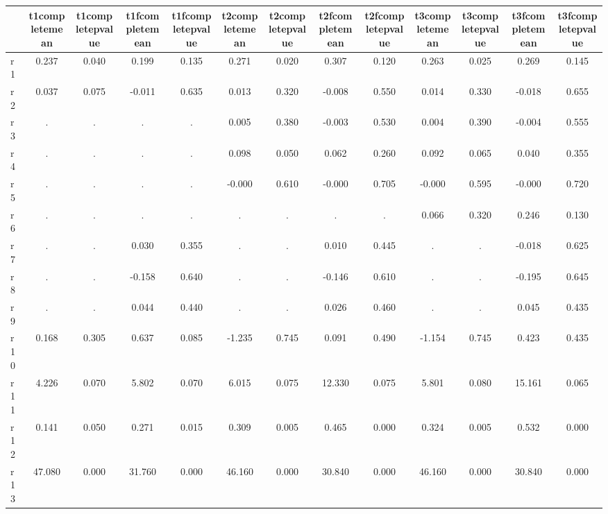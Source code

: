 \begin{table}[htbp]
\begin{tabular}{lcccccccccccc} \hline \hline
 & t1completemean  & t1completepvalue  & t1fcompletemean  & t1fcompletepvalue  & t2completemean  & t2completepvalue  & t2fcompletemean  & t2fcompletepvalue  & t3completemean  & t3completepvalue  & t3fcompletemean  & t3fcompletepvalue  \\  \hline 
r1 &     0.237 &     0.040 &     0.199 &     0.135 &     0.271 &     0.020 &     0.307 &     0.120 &     0.263 &     0.025 &     0.269 &     0.145 \\  
r2 &     0.037 &     0.075 &    -0.011 &     0.635 &     0.013 &     0.320 &    -0.008 &     0.550 &     0.014 &     0.330 &    -0.018 &     0.655 \\  
r3 &         . &         . &         . &         . &     0.005 &     0.380 &    -0.003 &     0.530 &     0.004 &     0.390 &    -0.004 &     0.555 \\  
r4 &         . &         . &         . &         . &     0.098 &     0.050 &     0.062 &     0.260 &     0.092 &     0.065 &     0.040 &     0.355 \\  
r5 &         . &         . &         . &         . &    -0.000 &     0.610 &    -0.000 &     0.705 &    -0.000 &     0.595 &    -0.000 &     0.720 \\  
r6 &         . &         . &         . &         . &         . &         . &         . &         . &     0.066 &     0.320 &     0.246 &     0.130 \\  
r7 &         . &         . &     0.030 &     0.355 &         . &         . &     0.010 &     0.445 &         . &         . &    -0.018 &     0.625 \\  
r8 &         . &         . &    -0.158 &     0.640 &         . &         . &    -0.146 &     0.610 &         . &         . &    -0.195 &     0.645 \\  
r9 &         . &         . &     0.044 &     0.440 &         . &         . &     0.026 &     0.460 &         . &         . &     0.045 &     0.435 \\  
r10 &     0.168 &     0.305 &     0.637 &     0.085 &    -1.235 &     0.745 &     0.091 &     0.490 &    -1.154 &     0.745 &     0.423 &     0.435 \\  
r11 &     4.226 &     0.070 &     5.802 &     0.070 &     6.015 &     0.075 &    12.330 &     0.075 &     5.801 &     0.080 &    15.161 &     0.065 \\  
r12 &     0.141 &     0.050 &     0.271 &     0.015 &     0.309 &     0.005 &     0.465 &     0.000 &     0.324 &     0.005 &     0.532 &     0.000 \\  
r13 &    47.080 &     0.000 &    31.760 &     0.000 &    46.160 &     0.000 &    30.840 &     0.000 &    46.160 &     0.000 &    30.840 &     0.000 \\  
\hline \hline \end{tabular}
\end{table}
